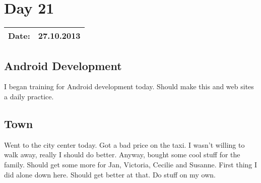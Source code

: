 \section{Day 21}
\begin{tabular}{|c|c|}
\hline
Date: & 27.10.2013 \\
\hline
\end{tabular}
\subsection{Android Development}
I began training for Android development today.
Should make this and web sites a daily practice.
\subsection{Town}
Went to the city center today. Got a bad price on the taxi.
I wasn't willing to walk away, really I should do better.
Anyway, bought some cool stuff for the family. Should get some more for Jan, Victoria, Cecilie and Susanne.
First thing I did alone down here. Should get better at that. Do stuff on my own.

